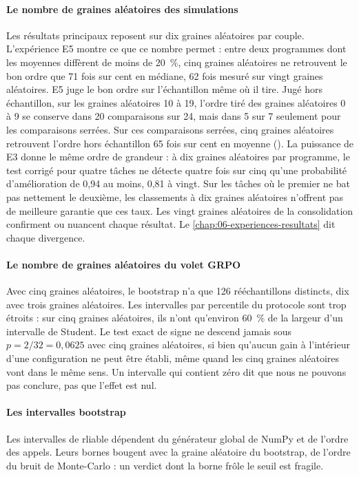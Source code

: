 \paragraph{Le nombre de graines aléatoires des simulations} Les résultats principaux reposent sur
dix graines aléatoires par couple. L'expérience E5 montre ce que ce nombre permet : entre deux
programmes dont les moyennes diffèrent de moins de 20~\%, cinq graines aléatoires ne retrouvent le bon
ordre que 71 fois sur cent en médiane, 62 fois mesuré sur vingt graines aléatoires. E5 juge le bon
ordre sur l'échantillon même où il tire. Jugé hors échantillon, sur les graines aléatoires 10 à 19,
l'ordre tiré des graines aléatoires 0 à 9 se conserve dans 20 comparaisons sur 24, mais dans 5 sur 7
seulement pour les comparaisons serrées. Sur ces comparaisons serrées, cinq graines aléatoires
retrouvent l'ordre hors échantillon 65 fois sur cent en moyenne
(). La puissance de E3 donne le même
ordre de grandeur : à dix graines aléatoires par programme, le test corrigé pour quatre tâches ne
détecte quatre fois sur cinq qu'une probabilité d'amélioration de 0,94 au moins, 0,81 à vingt. Sur les tâches où le premier ne bat pas nettement le deuxième, les classements à dix
graines aléatoires n'offrent pas de meilleure garantie que ces taux. Les vingt graines aléatoires de la consolidation confirment ou
nuancent chaque résultat. Le \cref{chap:06-experiences-resultats} dit chaque divergence.

\paragraph{Le nombre de graines aléatoires du volet GRPO} Avec cinq graines aléatoires, le bootstrap
n'a que 126 rééchantillons distincts, dix avec trois graines aléatoires. Les intervalles par
percentile du protocole sont trop étroits : sur cinq graines aléatoires, ils n'ont qu'environ 60~\%
de la largeur d'un intervalle de Student. Le test exact de signe ne descend jamais sous
$p = 2/32 = 0{,}0625$ avec cinq graines aléatoires, si bien qu'aucun gain à l'intérieur d'une
configuration ne peut être établi, même quand les cinq graines aléatoires vont dans le même sens. Un intervalle qui contient zéro dit que nous ne pouvons pas conclure, pas
que l'effet est nul.

\paragraph{Les intervalles bootstrap} Les intervalles de rliable dépendent du générateur global de
NumPy et de l'ordre des appels. Leurs bornes bougent avec la graine aléatoire du bootstrap, de
l'ordre du bruit de Monte-Carlo : un verdict dont la borne frôle le seuil
est fragile.

